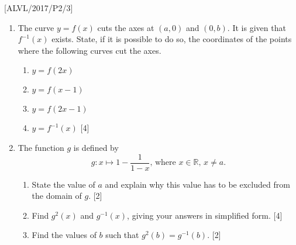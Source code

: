 \item {[}ALVL/2017/P2/3{]}
\begin{enumerate}
\item The curve $y=f\left(x\right)$ cuts the axes at $\left(a,0\right)$
and $\left(0,b\right)$. It is given that $f^{-1}\left(x\right)$
exists. State, if it is possible to do so, the coordinates of the
points where the following curves cut the axes. 
\begin{enumerate}
\item $y=f\left(2x\right)$
\item $y=f\left(x-1\right)$
\item $y=f\left(2x-1\right)$
\item $y=f^{-1}\left(x\right)$ \hfill{}{[}4{]}
\end{enumerate}
\item The function $g$ is defined by 
\[
g:x\mapsto1-\frac{1}{1-x},\,\text{where }x\in\mathbb{R},\,x\neq a.
\]

\begin{enumerate}
\item State the value of $a$ and explain why this value has to be excluded
from the domain of $g$. \hfill{}{[}2{]}
\item Find $g^{2}\left(x\right)$ and $g^{-1}\left(x\right)$, giving your
answers in simplified form. \hfill{}{[}4{]}
\item Find the values of $b$ such that $g^{2}\left(b\right)=g^{-1}\left(b\right)$.
\hfill{}{[}2{]}
\end{enumerate}
\end{enumerate}
